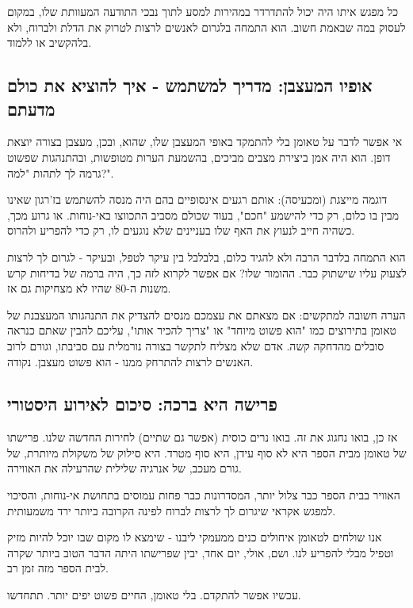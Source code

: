 \documentclass[12pt]{article}
\begin{document}
כל מפגש איתו היה יכול להתדרדר במהירות למסע לתוך נבכי התודעה המעוותת שלו, במקום לעסוק במה שבאמת חשוב. הוא התמחה בלגרום לאנשים לרצות לטרוק את הדלת ולברוח, ולא בלהקשיב או ללמוד.

\subsection*{אופיו המעצבן: מדריך למשתמש - איך להוציא את כולם מדעתם}

אי אפשר לדבר על טאומן בלי להתמקד באופי המעצבן שלו, שהוא, ובכן, מעצבן בצורה יוצאת דופן. הוא היה אמן ביצירת מצבים מביכים, בהשמעת הערות מטופשות, ובהתנהגות שפשוט גרמה לך לתהות "למה?".

\begin{exampleBox}{דוגמה מייצגת (ומכעיסה):}
אותם רגעים אינסופיים בהם היה מנסה להשתמש בז'רגון שאינו מבין בו כלום, רק כדי להישמע "חכם", בעוד שכולם מסביב התכווצו באי-נוחות. או גרוע מכך, כשהיה חייב לנעוץ את האף שלו בעניינים שלא נוגעים לו, רק כדי להפריע ולהרוס.
\end{exampleBox}

הוא התמחה בלדבר הרבה ולא להגיד כלום, בלבלבל בין עיקר לטפל, ובעיקר - לגרום לך לרצות לצעוק עליו שישתוק כבר. ההומור שלו? אם אפשר לקרוא לזה כך, היה ברמה של בדיחות קרש משנות ה-80 שהיו לא מצחיקות גם אז.

\begin{remarkBox}{הערה חשובה למתקשים:}
אם מצאתם את עצמכם מנסים להצדיק את התנהגותו המעצבנת של טאומן בתירוצים כמו "הוא פשוט מיוחד" או "צריך להכיר אותו", עליכם להבין שאתם כנראה סובלים מהדחקה קשה. אדם שלא מצליח לתקשר בצורה נורמלית עם סביבתו, וגורם לרוב האנשים לרצות להתרחק ממנו - הוא פשוט מעצבן. נקודה.
\end{remarkBox}

\subsection*{פרישה היא ברכה: סיכום לאירוע היסטורי}

אז כן, בואו נחגוג את זה. בואו נרים כוסית (אפשר גם שתיים) לחירות החדשה שלנו. פרישתו של טאומן מבית הספר היא לא סוף עידן, היא סוף מטרד. היא סילוק של משקולת מיותרת, של גורם מעכב, של אנרגיה שלילית שהרעילה את האווירה.

האוויר בבית הספר כבר צלול יותר, המסדרונות כבר פחות עמוסים בתחושת אי-נוחות, והסיכוי למפגש אקראי שיגרום לך לרצות לברוח לפינה הקרובה ביותר ירד משמעותית.

אנו שולחים לטאומן איחולים כנים ממעמקי ליבנו - שימצא לו מקום שבו יוכל להיות מזיק וטפיל מבלי להפריע לנו. ושם, אולי, יום אחד, יבין שפרישתו היתה הדבר הטוב ביותר שקרה לבית הספר מזה זמן רב.

עכשיו אפשר להתקדם. בלי טאומן, החיים פשוט יפים יותר. תתחדשו.
\end{document}
